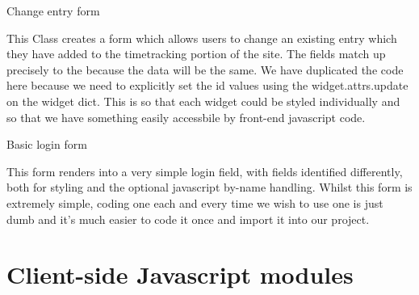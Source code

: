 \documentclass[letterpaper,10pt,english]{sphinxmanual}
\begin{document}

\begin{fulllineitems}
\label{timetracker:timetracker.tracker.forms.EntryForm}
Change entry form

This Class creates a form which allows users to change an existing entry
which they have added to the timetracking portion of the site. The fields
match up precisely to the {\hyperref[timetracker:timetracker.tracker.forms.AddForm]{}} because the data will be the
same. We have duplicated the code here because we need to explicitly set
the id values using the widget.attrs.update on the widget dict. This is so
that each widget could be styled individually and so that we have
something easily accessbile by front-end javascript code.

\end{fulllineitems}


\begin{fulllineitems}
\label{timetracker:timetracker.tracker.forms.Login}
Basic login form

This form renders into a very simple login field, with fields identified
differently, both for styling and the optional javascript by-name
handling. Whilst this form is extremely simple, coding one each and
every time we wish to use one is just dumb and it's much easier to code it
once and import it into our project.

\end{fulllineitems}



\section{Client-side Javascript modules}
\label{javascript-files:client-side-javascript-modules}\label{javascript-files::doc}
\end{document}
